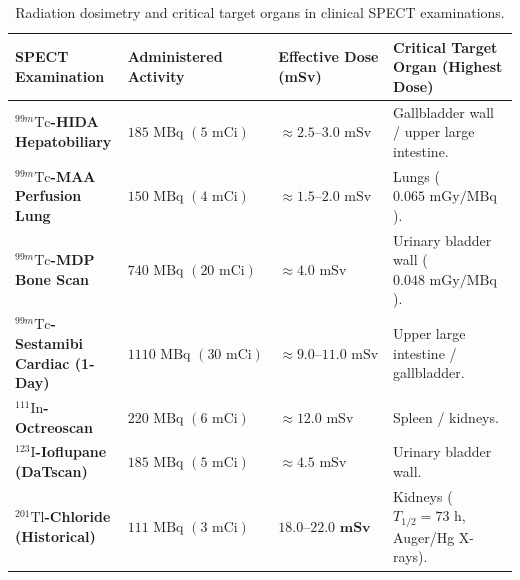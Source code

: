 \documentclass[11pt,a4paper]{article}
\begin{document}
\begin{table}[htbp]
\centering
\small
\renewcommand{\arraystretch}{1.2}
\begin{tabular}{p{4.5cm}p{3cm}p{3cm}p{4.5cm}}
\toprule
\textbf{SPECT Examination} & \textbf{Administered Activity} & \textbf{Effective Dose (mSv)} & \textbf{Critical Target Organ (Highest Dose)} \\
\midrule
\textbf{$^{99m}\text{Tc}$-HIDA Hepatobiliary} & $185\text{ MBq } (5\text{ mCi})$ & $\approx 2.5\text{--}3.0\text{ mSv}$ & Gallbladder wall / upper large intestine. \\
\textbf{$^{99m}\text{Tc}$-MAA Perfusion Lung} & $150\text{ MBq } (4\text{ mCi})$ & $\approx 1.5\text{--}2.0\text{ mSv}$ & Lungs ($0.065\text{ mGy/MBq}$). \\
\textbf{$^{99m}\text{Tc}$-MDP Bone Scan} & $740\text{ MBq } (20\text{ mCi})$ & $\approx 4.0\text{ mSv}$ & Urinary bladder wall ($0.048\text{ mGy/MBq}$). \\
\textbf{$^{99m}\text{Tc}$-Sestamibi Cardiac (1-Day)} & $1110\text{ MBq } (30\text{ mCi})$ & $\approx 9.0\text{--}11.0\text{ mSv}$ & Upper large intestine / gallbladder. \\
\textbf{$^{111}\text{In}$-Octreoscan} & $220\text{ MBq } (6\text{ mCi})$ & $\approx 12.0\text{ mSv}$ & Spleen / kidneys. \\
\textbf{$^{123}\text{I}$-Ioflupane (DaTscan)} & $185\text{ MBq } (5\text{ mCi})$ & $\approx 4.5\text{ mSv}$ & Urinary bladder wall. \\
\textbf{$^{201}\text{Tl}$-Chloride (Historical)} & $111\text{ MBq } (3\text{ mCi})$ & $\mathbf{18.0\text{--}22.0\text{ mSv}}$ & Kidneys ($T_{1/2} = 73\text{ h}$, Auger/Hg X-rays). \\
\bottomrule
\end{tabular}
\caption{Radiation dosimetry and critical target organs in clinical SPECT examinations.}
\label{tab:spect_dosimetry}
\end{table}
\end{document}
